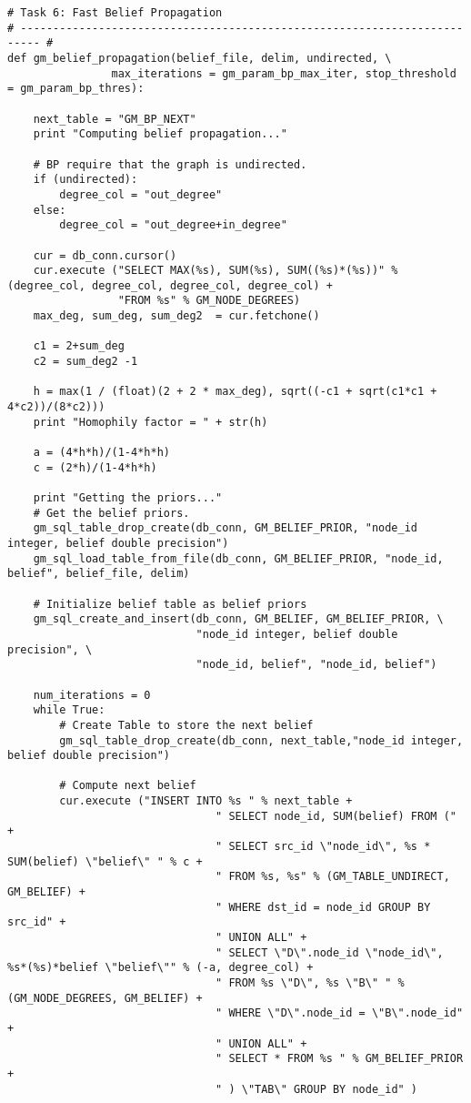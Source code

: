 \documentclass[11pt]{article}
\begin{document}
\begin{lstlisting}
# Task 6: Fast Belief Propagation
# ------------------------------------------------------------------------- #
def gm_belief_propagation(belief_file, delim, undirected, \
                max_iterations = gm_param_bp_max_iter, stop_threshold = gm_param_bp_thres):

    next_table = "GM_BP_NEXT"
    print "Computing belief propagation..."

    # BP require that the graph is undirected. 
    if (undirected):
        degree_col = "out_degree"
    else:
        degree_col = "out_degree+in_degree"
    
    cur = db_conn.cursor()
    cur.execute ("SELECT MAX(%s), SUM(%s), SUM((%s)*(%s))" % (degree_col, degree_col, degree_col, degree_col) +
                 "FROM %s" % GM_NODE_DEGREES)
    max_deg, sum_deg, sum_deg2  = cur.fetchone()
      
    c1 = 2+sum_deg
    c2 = sum_deg2 -1
       
    h = max(1 / (float)(2 + 2 * max_deg), sqrt((-c1 + sqrt(c1*c1 + 4*c2))/(8*c2)))
    print "Homophily factor = " + str(h)    
    
    a = (4*h*h)/(1-4*h*h)
    c = (2*h)/(1-4*h*h)

    print "Getting the priors..."
    # Get the belief priors. 
    gm_sql_table_drop_create(db_conn, GM_BELIEF_PRIOR, "node_id integer, belief double precision")
    gm_sql_load_table_from_file(db_conn, GM_BELIEF_PRIOR, "node_id, belief", belief_file, delim)
    
    # Initialize belief table as belief priors
    gm_sql_create_and_insert(db_conn, GM_BELIEF, GM_BELIEF_PRIOR, \
                             "node_id integer, belief double precision", \
                             "node_id, belief", "node_id, belief")
                             
    num_iterations = 0
    while True:
        # Create Table to store the next belief
        gm_sql_table_drop_create(db_conn, next_table,"node_id integer, belief double precision")
        
        # Compute next belief
        cur.execute ("INSERT INTO %s " % next_table + 
                                " SELECT node_id, SUM(belief) FROM (" +
                                " SELECT src_id \"node_id\", %s * SUM(belief) \"belief\" " % c +
                                " FROM %s, %s" % (GM_TABLE_UNDIRECT, GM_BELIEF) +
                                " WHERE dst_id = node_id GROUP BY src_id" +
                                " UNION ALL" + 
                                " SELECT \"D\".node_id \"node_id\", %s*(%s)*belief \"belief\"" % (-a, degree_col) + 
                                " FROM %s \"D\", %s \"B\" " % (GM_NODE_DEGREES, GM_BELIEF) + 
                                " WHERE \"D\".node_id = \"B\".node_id" +
                                " UNION ALL" +
                                " SELECT * FROM %s " % GM_BELIEF_PRIOR +
                                " ) \"TAB\" GROUP BY node_id" )
                                

\end{lstlisting}
\end{document}

